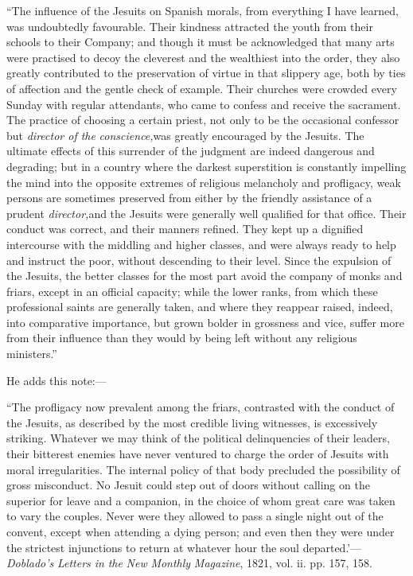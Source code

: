 ``The influence of the Jesuits on Spanish morals,
from everything I have learned, was undoubtedly
favourable. Their kindness attracted the youth from their
schools to their Company; and though it must be
acknowledged that many arts were practised to decoy the
cleverest and the wealthiest into the order, they also
greatly contributed to the preservation of virtue in that
slippery age, both by ties of affection and the gentle
check of example. Their churches were crowded every
Sunday with regular attendants, who came to confess and
receive the sacrament. The practice of choosing a certain
priest, not only to be the occasional confessor but \emph{director
of the} \emph{conscience,}was greatly encouraged by
the Jesuits. The ultimate effects of this surrender of
the judgment are indeed dangerous and degrading; but in a
country where the darkest superstition is constantly
impelling the mind into the opposite extremes of
religious melancholy and profligacy, weak persons are
sometimes preserved from either by the friendly
assistance of a prudent \emph{director,}and the Jesuits
were generally well qualified for that office. Their
conduct was correct, and their manners refined. They kept
up a dignified intercourse with the middling and higher
classes, and were always ready to help and instruct the
poor, without descending to their level. Since the
expulsion of the Jesuits, the better classes for the most
part avoid the company of monks and friars, except in an
official capacity; while the lower ranks, from which
these professional saints are generally taken, and where
they reappear raised, indeed, into comparative
importance, but grown bolder in grossness and vice,
suffer more from their influence than they would by being
left without any religious ministers.''


He adds this note:—


``The profligacy now prevalent among the friars,
contrasted with the conduct of the Jesuits, as described
by the most credible living witnesses, is excessively
striking. Whatever we may think of\textbf{\emph{ }}the
political delinquencies of their leaders, their bitterest
enemies have never ventured to charge the order of
Jesuits with moral irregularities. The internal policy of
that body precluded the possibility of gross misconduct.
No Jesuit could step out of doors without calling on the
superior for leave and a companion, in the choice of whom
great care was taken to vary the couples. Never were they
allowed to pass a single night out of the convent, except
when attending a dying person; and even then they were
under the strictest injunctions to return at whatever
hour the soul departed.'—\emph{Doblado's}\textbf{\emph{
}}\emph{Letters in}\textbf{\emph{ }}\emph{the} \emph{New}\textbf{\emph{
}}\emph{Monthly}\textbf{\emph{ }}\emph{Magazine},
1821, vol. ii. pp. 157, 158.


